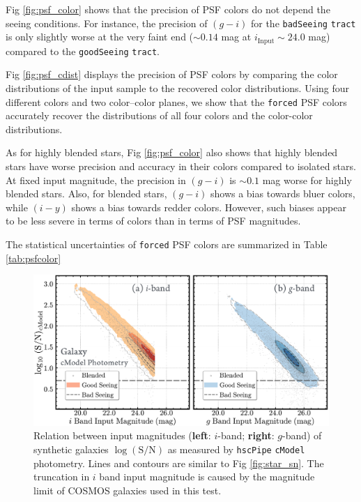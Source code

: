 \documentclass[useamsfonts]{pasj01}
\def\hscpipe{\texttt{hscPipe}}
\def\cmodel{\texttt{cModel}}
\def\forced{\texttt{forced}}
\def\tract{\texttt{tract}}
\begin{document}
    Fig \ref{fig:psf_color} shows that the precision of PSF colors do not depend 
    the seeing conditions. 
    For instance, the precision of $(g-i)$ for the \texttt{badSeeing} \tract{} is 
    only slightly worse at the very faint end (${\sim}0.14$ mag at
    $i_{\mathrm{Input}}{\sim}24.0$ mag) compared to the \texttt{goodSeeing} \tract{}.

    Fig \ref{fig:psf_cdist} displays the precision of PSF colors by comparing the 
    color distributions of the input sample to the recovered color distributions. 
    Using four different colors and two color--color planes, we show that the 
    \forced{} PSF colors accurately recover the distributions of all four colors 
    and the color-color distributions.

    As for highly blended stars, Fig \ref{fig:psf_color} also shows that highly blended 
    stars have worse precision and accuracy in their colors compared to isolated stars. 
    At fixed input magnitude, the precision in $(g-i)$ is ${\sim}0.1$ mag worse for 
    highly blended stars.  
    Also, for blended stars, $(g-i)$ shows a bias towards bluer colors, while $(i-y)$ 
    shows a bias towards redder colors. 
    However, such biases appear to be less severe in terms of colors than in terms of
    PSF magnitudes.
    
	The statistical uncertainties of \forced{} PSF colors are summarized in 
	Table \ref{tab:psfcolor}
    

\begin{figure}
    \begin{center}
        \includegraphics[width=\textwidth]{fig/synpipe_galaxy_sn}
    \end{center}
    \caption{
        Relation between input magnitudes (\textbf{left}: $i$-band; \textbf{right}:
        $g$-band) of synthetic galaxies $\log (\mathrm{S}/\mathrm{N})$ as measured 
        by \hscpipe{} \cmodel{} photometry. 
        Lines and contours are similar to Fig \ref{fig:star_sn}.
        The truncation in $i$ band input magnitude is caused by the magnitude limit 
        of COSMOS galaxies used in this test. 
        }
    \label{fig:cmodel_sn}
\end{figure}
\end{document}
